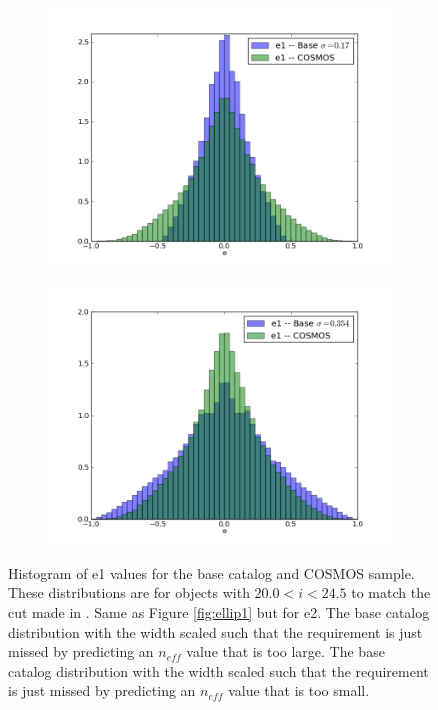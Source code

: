 \documentclass[]{article}
\begin{document}
{\begin{figure}[H]
        \begin{subfigure}[b]{0.3\textwidth}
              \centering
              \includegraphics[width=\textwidth]{validation_figures/e1_hist_s_17.png}
              \label{fig:ellip_errbig}
     \end{subfigure}
     \begin{subfigure}[b]{0.3\textwidth}
             \centering
             \includegraphics[width=\textwidth]{validation_figures/e1_hist_s_354.png}
            \label{fig:ellip_errbig}
     \end{subfigure}

\caption{Histogram of e1 values for the base catalog and COSMOS sample.  These distributions are for objects with $20.0 < i < 24.5$ to match
the cut made in \citet{chang}.
Same as Figure \ref{fig:ellip1} but for e2.
The base catalog distribution with the width scaled such that the requirement is just missed by predicting an $n_{eff}$ value that is too large.
The base catalog distribution with the width scaled such that the requirement is just missed by predicting an $n_{eff}$ value that is too small.}
\end{figure}

}
\end{document}
